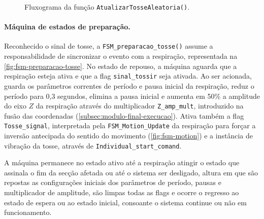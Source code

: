 \begin{figure}[p]
{{}}
  \caption{Fluxograma da função \texttt{AtualizarTosseAleatoria()}.}
  \label{fig:tosse-aleatoria}
\end{figure}

\paragraph{Máquina de estados de preparação.}
Reconhecido o sinal de tosse, a \texttt{FSM\_preparacao\_tosse()} assume a responsabilidade de sincronizar o evento com a respiração, representada na \cref{fig:fsm-preparacao-tosse}. No estado de repouso, a máquina aguarda que a respiração esteja ativa e que a flag \texttt{sinal\_tossir} seja ativada. Ao ser acionada, guarda os parâmetros correntes de período e pausa inicial da respiração, reduz o período para 0,3 segundos, elimina a pausa inicial e aumenta em 50\% a amplitude do eixo \(Z\) da respiração através do multiplicador \texttt{Z\_amp\_mult}, introduzido na fusão das coordenadas (\cref{subsec:modulo-final-execucao}). Ativa também a flag \texttt{Tosse\_signal}, interpretada pela \texttt{FSM\_Motion\_Update} da respiração para forçar a inversão antecipada do sentido do movimento (\cref{fig:fsm-motion}) e a instância de vibração da tosse, através de \texttt{Individual\_start\_comand}.

A máquina permanece no estado ativo até a respiração atingir o estado que assinala o fim da secção afetada ou até o sistema ser desligado, altura em que são repostas as configurações iniciais dos parâmetros de período, pausas e multiplicador de amplitude, são limpas todas as flags e ocorre o regresso ao estado de espera ou ao estado inicial, consoante o sistema continue ou não em funcionamento.

